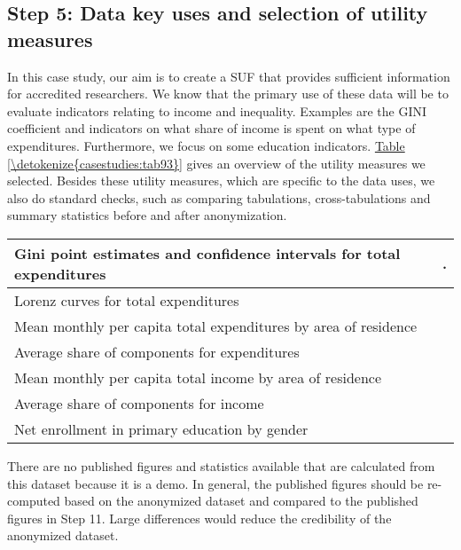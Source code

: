 \documentclass[letterpaper,10pt,english]{sphinxmanual}
\begin{document}
\subsection{Step 5: Data key uses and selection of utility measures}
\label{\detokenize{casestudies:step-5-data-key-uses-and-selection-of-utility-measures}}
In this case study, our aim is to create a SUF that provides sufficient
information for accredited researchers. We know that the primary use of
these data will be to evaluate indicators relating to income and
inequality. Examples are the GINI coefficient and indicators on what
share of income is spent on what type of expenditures. Furthermore, we
focus on some education indicators. \hyperref[\detokenize{casestudies:tab93}]{Table \ref{\detokenize{casestudies:tab93}}} gives an overview of the
utility measures we selected. Besides these utility measures, which are
specific to the data uses, we also do standard checks, such as comparing
tabulations, cross-tabulations and summary statistics before and after
anonymization.


\begin{savenotes}\sphinxattablestart
\centering
{}
\label{\detokenize{casestudies:tab93}}\label{\detokenize{casestudies:id23}}
\sphinxaftercaption
\begin{tabulary}{\linewidth}[t]{|T|T|}
\hline

Gini point estimates and confidence intervals for total expenditures
&
.
\\
\hline
Lorenz curves for total expenditures
&\\
\hline
Mean monthly per capita total expenditures by area of residence
&\\
\hline
Average share of components for expenditures
&\\
\hline
Mean monthly per capita total income by area of residence
&\\
\hline
Average share of components for income
&\\
\hline
Net enrollment in primary education by gender
&\\
\hline
\end{tabulary}
\par
\sphinxattableend\end{savenotes}

There are no published figures and statistics available that are
calculated from this dataset because it is a demo. In general, the
published figures should be re-computed based on the anonymized dataset
and compared to the published figures in Step 11. Large differences
would reduce the credibility of the anonymized dataset.
\end{document}
